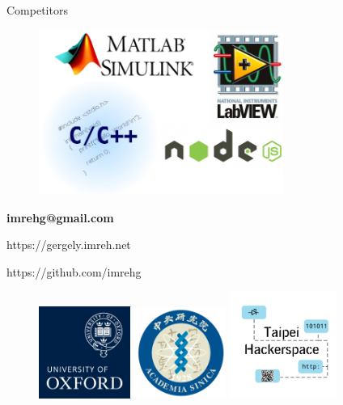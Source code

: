 \documentclass{beamer}
\begin{document}
\begin{frame}{Competitors}

\begin{figure}[ht]
	\includegraphics[width=8cm]{competitors.png}
\end{figure}

\end{frame}



\begin{frame}[fragile]

\textbf{imrehg@gmail.com}

https://gergely.imreh.net

https://github.com/imrehg

\begin{figure}[ht]
	\includegraphics[width=3cm]{Oxford_Logo.png}
	\includegraphics[width=3cm]{Sinica_Logo.png}
	\includegraphics[width=3.5cm]{Hackerspace_Logo.png}
\end{figure}


\end{frame}
\end{document}
